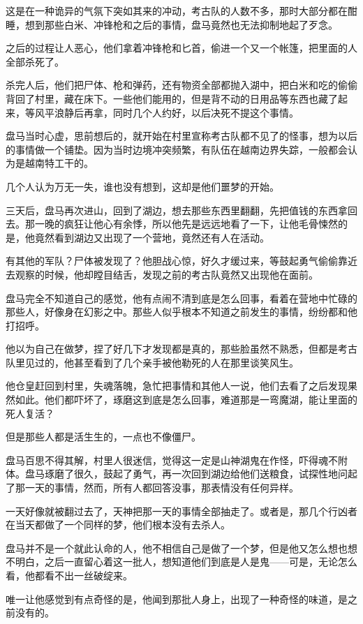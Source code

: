 这是在一种诡异的气氛下突如其来的冲动，考古队的人数不多，那时大部分都在酣睡，想到那些白米、冲锋枪和之后的事情，盘马竟然也无法抑制地起了歹念。

之后的过程让人恶心，他们拿着冲锋枪和匕首，偷进一个又一个帐篷，把里面的人全部杀死了。

杀完人后，他们把尸体、枪和弹药，还有物资全部都抛入湖中，把白米和吃的偷偷背回了村里，藏在床下。一些他们能用的，但是背不动的日用品等东西也藏了起来，等风平浪静后再拿，同时几个人约好，以后决死不提这个事情。

盘马当时心虚，思前想后的，就开始在村里宣称考古队都不见了的怪事，想为以后的事情做一个铺垫。因为当时边境冲突频繁，有队伍在越南边界失踪，一般都会认为是越南特工干的。

几个人认为万无一失，谁也没有想到，这却是他们噩梦的开始。

三天后，盘马再次进山，回到了湖边，想去那些东西里翻翻，先把值钱的东西拿回去。那一晚的疯狂让他心有余悸，所以他先是远远地看了一下，让他毛骨悚然的是，他竟然看到湖边又出现了一个营地，竟然还有人在活动。

有其他的军队？尸体被发现了？他胆战心惊，好久才缓过来，等鼓起勇气偷偷靠近去观察的时候，他却瞠目结舌，发现之前的考古队竟然又出现他在面前。

盘马完全不知道自己的感觉，他有点闹不清到底是怎么回事，看着在营地中忙碌的那些人，好像身在幻影之中。那些人似乎根本不知道之前发生的事情，纷纷都和他打招呼。

他以为自己在做梦，捏了好几下才发现都是真的，那些脸虽然不熟悉，但都是考古队里见过的，他甚至看到了几个亲手被他勒死的人在那里谈笑风生。

他仓皇赶回到村里，失魂落魄，急忙把事情和其他人一说，他们去看了之后发现果然如此。他们都吓坏了，琢磨这到底是怎么回事，难道那是一弯魔湖，能让里面的死人复活？

但是那些人都是活生生的，一点也不像僵尸。

盘马百思不得其解，村里人很迷信，觉得这一定是山神湖鬼在作怪，吓得魂不附体。盘马琢磨了很久，鼓起了勇气，再一次回到湖边给他们送粮食，试探性地问起了那一天的事情，然而，所有人都回答没事，那表情没有任何异样。

一天好像就被翻过去了，天神把那一天的事情全部抽走了。或者是，那几个行凶者在当天都做了一个同样的梦，他们根本没有去杀人。

盘马并不是一个就此认命的人，他不相信自己是做了一个梦，但是他又怎么想也想不明白，之后一直留心着这一批人，想知道他们到底是人是鬼——可是，无论怎么看，他都看不出一丝破绽来。

唯一让他感觉到有点奇怪的是，他闻到那批人身上，出现了一种奇怪的味道，是之前没有的。

